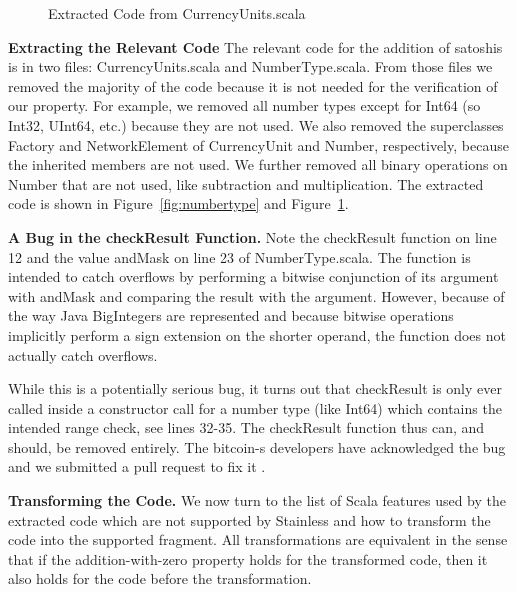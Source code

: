 \documentclass[runningheads]{llncs}
\renewcommand{\paragraph}{\textbf}%
\begin{document}
\begin{figure}

  \caption{Extracted Code from CurrencyUnits.scala}
  \label{fig:currencyunits}
\end{figure}

\paragraph{Extracting the Relevant Code} The relevant code for the
addition of satoshis is in two files: CurrencyUnits.scala and
NumberType.scala. From those files we removed the majority of the code
because it is not needed for the verification of our property. For
example, we removed all number types except for Int64 (so Int32,
UInt64, etc.) because they are not used. We also removed the
superclasses Factory and NetworkElement of CurrencyUnit and Number,
respectively, because the inherited members are not used. We further
removed all binary operations on Number that are not used, like
subtraction and multiplication. The extracted code is shown in
Figure~\ref{fig:numbertype} and Figure~\ref{fig:currencyunits}.

\paragraph{A Bug in the checkResult Function.} Note the checkResult
function on line 12 and the value andMask on line 23 of
NumberType.scala. The function is intended to catch overflows by
performing a bitwise conjunction of its argument with andMask and
comparing the result with the argument. However, because of the way
Java BigIntegers are represented \cite{wikipedia:twocomp} and because
bitwise operations implicitly perform a sign extension
\cite{java:bigint} on the shorter operand, the function does not
actually catch overflows.

While this is a potentially serious bug, it turns out that checkResult
is only ever called inside a constructor call for a number type (like
Int64) which contains the intended range check, see lines 32-35. The
checkResult function thus can, and should, be removed entirely. The
bitcoin-s developers have acknowledged the bug and we submitted a pull
request to fix it \cite{BitcoinS:pull565}.


\paragraph{Transforming the Code.} We now turn to the list of Scala
features used by the extracted code which are not supported by
Stainless and how to transform the code into the supported fragment.
All transformations are equivalent in the sense that if the
addition-with-zero property holds for the transformed code, then it
also holds for the code before the transformation.
\end{document}

